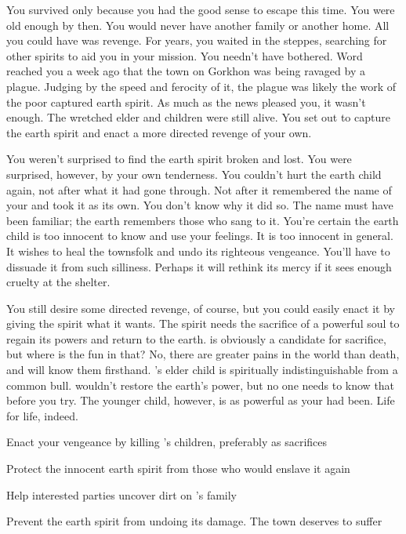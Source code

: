 \documentclass[char]{guildcamp4}
\begin{document}
You survived only because you had the good sense to escape this time. You were old enough by then. You would never have another family or another home. All you could have was revenge. For years, you waited in the steppes, searching for other spirits to aid you in your mission. You needn't have bothered. Word reached you a week ago that the town on Gorkhon was being ravaged by a plague. Judging by the speed and ferocity of it, the plague was likely the work of the poor captured earth spirit. As much as the news pleased you, it wasn't enough. The wretched elder and \cElder{\their} children were still alive. You set out to capture the earth spirit and enact a more directed revenge of your own.

You weren't surprised to find the earth spirit broken and lost. You were surprised, however, by your own tenderness. You couldn't hurt the earth child again, not after what it had gone through. Not after it remembered the name of your \cPlaguebearer{\offspring} and took it as its own. You don't know why it did so. The name must have been familiar; the earth remembers those who sang to it. You're certain the earth child is too innocent to know and use your feelings. It is too innocent in general. It wishes to heal the townsfolk and undo its righteous vengeance. You'll have to dissuade it from such silliness. Perhaps it will rethink its mercy if it sees enough cruelty at the shelter.

You still desire some directed revenge, of course, but you could easily enact it by giving the spirit what it wants. The spirit needs the sacrifice of a powerful soul to regain its powers and return to the earth. \cElder{} is obviously a candidate for sacrifice, but where is the fun in that? No, there are greater pains in the world than death, and \cElder{} will know them firsthand. \cElder{}'s elder child is spiritually indistinguishable from a common bull. \cApprentice{\They} wouldn't restore the earth's power, but no one needs to know that before you try. The younger child, however, is as powerful as your \cPlaguebearer{} had been. Life for life, indeed.

\begin{itemz}[Goals]
	\item Enact your vengeance by killing \cElder{}'s children, preferably as sacrifices
	\item Protect the innocent earth spirit from those who would enslave it again
	\item Help interested parties uncover dirt on \cElder{}'s family
	\item Prevent the earth spirit from undoing its damage. The town deserves to suffer

\end{itemz}
\end{document}
